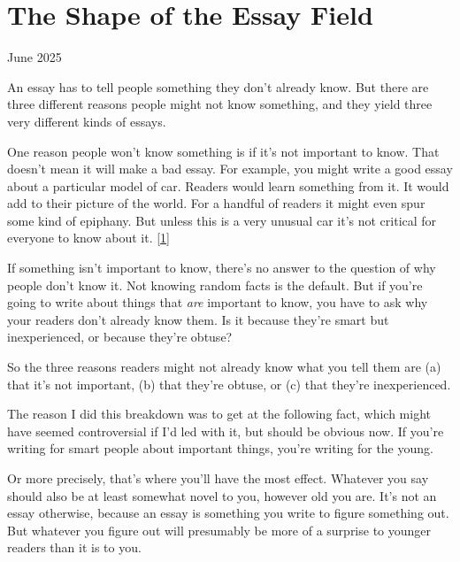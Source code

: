 \chapter{The Shape of the Essay Field}


          
        
          


          
            
              
                

June 2025

An essay has to tell people something
                  they don't already know. But there are three different reasons
                  people might not know something, and they yield three very
                  different kinds of essays.

One reason people won't
                  know something is if it's not important to know. That doesn't
                  mean it will make a bad essay. For example, you might write a
                  good essay about a particular model of car. Readers would
                  learn something from it. It would add to their picture of the
                  world. For a handful of readers it might even spur some kind
                  of epiphany. But unless this is a very unusual car it's not
                  critical for everyone to know about it.
                  [\href{\#f1n}{1}]

If something isn't important to know, there's no
                  answer to the question of why people don't know it. Not
                  knowing random facts is the default. But if you're going to
                  write about things that \emph{are} important to know, you have
                  to ask why your readers don't already know them. Is it because
                  they're smart but inexperienced, or because they're obtuse?

So
                  the three reasons readers might not already know what you tell
                  them are (a) that it's not important, (b) that they're obtuse,
                  or (c) that they're inexperienced.

The reason I did
                  this breakdown was to get at the following fact, which might
                  have seemed controversial if I'd led with it, but should be
                  obvious now. If you're writing for smart people about
                  important things, you're writing for the young.

Or
                  more precisely, that's where you'll have the most effect.
                  Whatever you say should also be at least somewhat novel to
                  you, however old you are. It's not an essay otherwise, because
                  an essay is something you write to figure something out. But
                  whatever you figure out will presumably be more of a surprise
                  to younger readers than it is to you.

